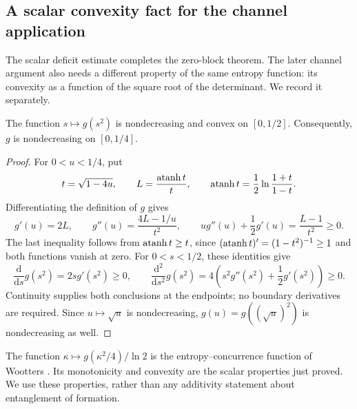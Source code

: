 \subsection{A scalar convexity fact for the channel application}

The scalar deficit estimate completes the zero-block theorem. The later
channel argument also needs a different property of the same entropy
function: its convexity as a function of the square root of the
determinant. We record it separately.

\begin{lemma}\label{lem:binary-spectrum}
The function $s\mapsto g(s^2)$ is nondecreasing and convex on $[0,1/2]$.
Consequently, $g$ is nondecreasing on $[0,1/4]$.
\end{lemma}

\begin{proof}
For $0<u<1/4$, put
\[
 t=\sqrt{1-4u},\qquad L=\frac{\operatorname{atanh} t}{t},\qquad
 \operatorname{atanh} t=\frac12\ln\frac{1+t}{1-t}.
\]
Differentiating the definition of $g$ gives
\begin{equation}\label{eq:g-derivatives}
 g'(u)=2L,\qquad
 g''(u)=\frac{4L-1/u}{t^2},\qquad
 ug''(u)+\frac12g'(u)=\frac{L-1}{t^2}\ge0.
\end{equation}
The last inequality follows from $\operatorname{atanh} t\ge t$, since
$(\operatorname{atanh} t)'=(1-t^2)^{-1}\ge1$ and both functions vanish at zero.
For $0<s<1/2$, these identities give
\[
 \frac{\mathrm d}{\mathrm ds}g(s^2)=2s g'(s^2)\ge0,\qquad
 \frac{\mathrm d^2}{\mathrm ds^2}g(s^2)
 =4\left(s^2g''(s^2)+\frac12g'(s^2)\right)\ge0.
\]
Continuity supplies both conclusions at the endpoints; no boundary
derivatives are required. Since $u\mapsto\sqrt u$ is nondecreasing,
$g(u)=g((\sqrt u)^2)$ is nondecreasing as well.
\end{proof}

The function $\kappa\mapsto g(\kappa^2/4)/\ln2$ is the
entropy--concurrence function of Wootters
\cite[Eq.~(8)]{Wootters1998}. Its monotonicity and convexity are the
scalar properties just proved. We use these properties, rather than
any additivity statement about entanglement of formation.

